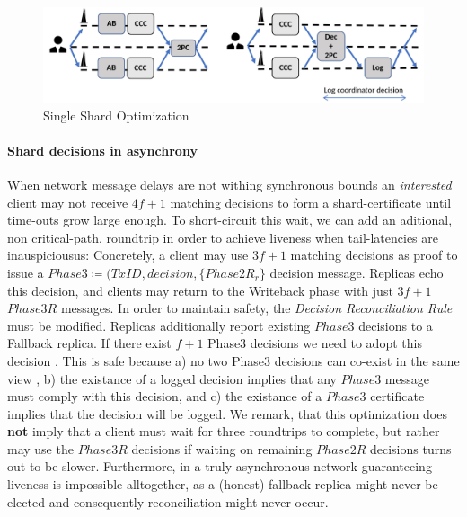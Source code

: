 \begin{figure}
\begin{center}
\includegraphics[width= \textwidth]{./figures/SingleShard.png}
\end{center}
\caption{Single Shard Optimization}
\label{fig:SingleShardOpt}
\end{figure}




\paragraph{Shard decisions in asynchrony}


When network message delays are not withing synchronous bounds an \textit{interested} client may not receive $4f+1$ matching decisions to form a shard-certificate until time-outs grow large enough. To short-circuit this wait, we can add an aditional, non critical-path, roundtrip in order to achieve liveness when tail-latencies are inauspiciousus: 
Concretely, a client may use $3f+1$ matching decisions as proof to issue a $Phase3 \coloneqq (TxID, decision, \{Phase2R_r\}$ decision message. Replicas echo this decision, and clients may return to the Writeback phase with just $3f+1$ $Phase3R$ messages. In order to maintain safety, the \textit{Decision Reconciliation Rule} must be modified. Replicas additionally report existing $Phase3$ decisions to a Fallback replica. If there exist $f+1$ Phase3 decisions we need to adopt this decision . This is safe because a) no two Phase3 decisions can co-exist in the same view , b) the existance of a logged decision implies that any $Phase3$ message must comply with this decision, and c) the existance of a $Phase3$ certificate implies that the decision will be logged. 
We remark, that this optimization does \textbf{not} imply that a client must wait for three roundtrips to complete, but rather may use the $Phase3R$ decisions if waiting on remaining $Phase2R$ decisions turns out to be slower. Furthermore, in a truly asynchronous network guaranteeing liveness is impossible alltogether, as a (honest) fallback replica might never be elected and consequently reconciliation might never occur.

